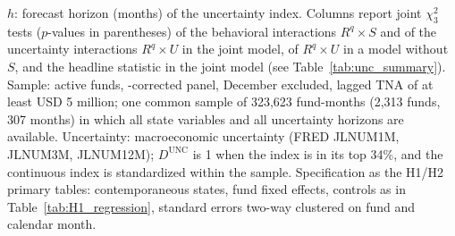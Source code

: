 \begin{table}[!htbp]
\begin{minipage}{\tabletempwidth}
\begin{singlespace}
$h$: forecast horizon (months) of the uncertainty index. Columns report joint $\chi^2_3$ tests ($p$-values in parentheses) of the behavioral interactions $R^q\times S$ and of the uncertainty interactions $R^q\times U$ in the joint model, of $R^q\times U$ in a model without $S$, and the headline statistic in the joint model (see Table~\ref{tab:unc_summary}). Sample: active funds, \textcite{Evans2010}-corrected panel, December excluded, lagged TNA of at least USD 5 million; one common sample of 323,623 fund-months (2,313 funds, 307 months) in which all state variables and all uncertainty horizons are available. Uncertainty: \textcite{JuradoLudvigsonNg2015} macroeconomic uncertainty (FRED JLNUM1M, JLNUM3M, JLNUM12M); $D^{\text{UNC}}$ is 1 when the index is in its top 34\%, and the continuous index is standardized within the sample. Specification as the H1/H2 primary tables: contemporaneous states, fund fixed effects, controls as in Table~\ref{tab:H1_regression}, standard errors two-way clustered on fund and calendar month.
\end{singlespace}
\end{minipage}
\end{table}

